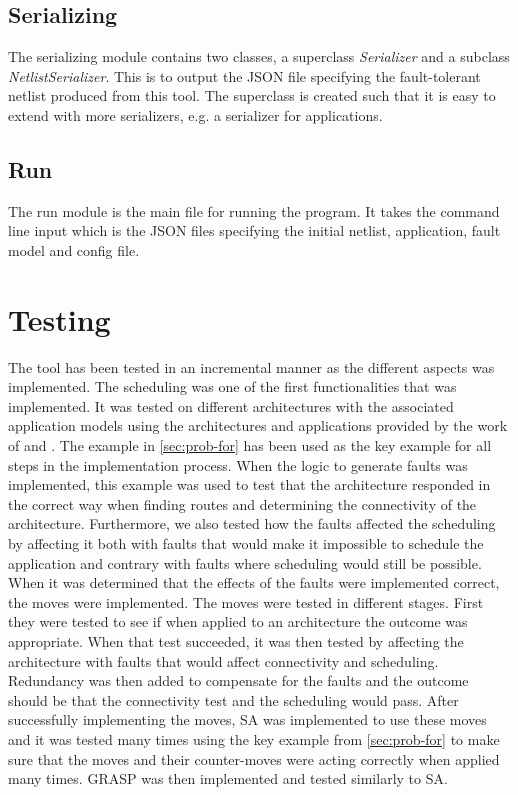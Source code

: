 \subsection{Serializing}
The serializing module contains two classes, a superclass \emph{Serializer} and a subclass \emph{NetlistSerializer}. This is to output the JSON file specifying the fault-tolerant netlist produced from this tool. The superclass is created such that it is easy to extend with more serializers, e.g. a serializer for applications. 

\subsection{Run}
The run module is the main file for running the program. It takes the command line input which is the JSON files specifying the initial netlist, application, fault model and config file.

\section{Testing}
The tool has been tested in an incremental manner as the different aspects was implemented. The scheduling was one of the first functionalities that was implemented. It was tested on different architectures with the associated application models using the architectures and applications provided by the work of \cite{wajid} and \cite{michael}. The example in \autoref{sec:prob-for} has been used as the key example for all steps in the implementation process. When the logic to generate faults was implemented, this example was used to test that the architecture responded in the correct way when finding routes and determining the connectivity of the architecture. Furthermore, we also tested how the faults affected the scheduling by affecting it both with faults that would make it impossible to schedule the application and contrary with faults where scheduling would still be possible. When it was determined that the effects of the faults were implemented correct, the moves were implemented. The moves were tested in different stages. First they were tested to see if when applied to an architecture the outcome was appropriate. When that test succeeded, it was then tested by affecting the architecture with faults that would affect connectivity and scheduling. Redundancy was then added to compensate for the faults and the outcome should be that the connectivity test and the scheduling would pass. After successfully implementing the moves, SA was implemented to use these moves and it was tested many times using the key example from \autoref{sec:prob-for} to make sure that the moves and their counter-moves were acting correctly when applied many times. GRASP was then implemented and tested similarly to SA.

